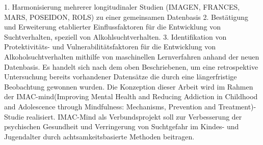 1.	Harmonisierung mehrerer longitudinaler Studien (IMAGEN, FRANCES, MARS, POSEIDON, ROLS) zu einer gemeinsamen Datenbasis
2.	Bestätigung und Erweiterung etablierter Einflussfaktoren für die Entwicklung von Suchtverhalten, speziell von Alkohlsuchtverhalten.
3.	Identifikation von Protektivitäts- und Vulnerabilitätsfaktoren für die Entwicklung von Alkoholsuchtverhalten mithilfe von maschinellen Lernverfahren anhand der neuen Datenbasis.
Es handelt sich nach dem oben Beschriebenen, um eine retrospektive Untersuchung bereits vorhandener Datensätze die durch eine längerfristige Beobachtung gewonnen wurden. Die Konzeption dieser Arbeit wird im Rahmen der IMAC-mind(Improving Mental Health and Reducing Addiction in Childhood and Adolescence through Mindfulness: Mechanisms, Prevention and Treatment)-Studie realisiert. IMAC-Mind als Verbundsprojekt soll zur Verbesserung der psychischen Gesundheit und Verringerung von Suchtgefahr im Kindes- und Jugendalter durch achtsamkeitsbasierte Methoden beitragen.




 
